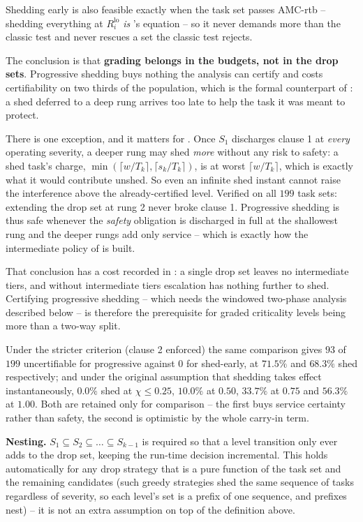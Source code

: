 \documentclass{article}
\begin{document}
Shedding early is also feasible exactly when the task set passes AMC-rtb --
shedding everything at $R_i^{\mathrm{lo}}$ \emph{is} 's
equation -- so it never demands more than the classic test and never rescues a
set the classic test rejects.

The conclusion is that \textbf{grading belongs in the budgets, not in the drop
sets}. Progressive shedding buys nothing the analysis can certify and costs
certifiability on two thirds of the population, which is the formal counterpart
of : a shed deferred to a deep rung arrives too late to help
the task it was meant to protect.

There is one exception, and it matters for . Once
$S_1$ discharges clause 1 at \emph{every} operating severity, a deeper rung may
shed \emph{more} without any risk to safety: a shed task's charge,
$\min(\lceil w/T_k \rceil, \lceil s_k/T_k \rceil)$, is at worst
$\lceil w/T_k \rceil$, which is exactly what it would contribute unshed. So
even an infinite shed instant cannot raise the interference above the
already-certified level. Verified on all $199$ task sets: extending the drop set
at rung 2 never broke clause 1. Progressive shedding is thus safe whenever the
\emph{safety} obligation is discharged in full at the shallowest rung and the
deeper rungs add only service -- which is exactly how the intermediate policy of
 is built.

That conclusion has a cost recorded in : a single drop set
leaves no intermediate tiers, and without intermediate tiers escalation has
nothing further to shed. Certifying progressive shedding -- which needs the
windowed two-phase analysis described below -- is therefore the prerequisite
for graded criticality levels being more than a two-way split.

Under the stricter criterion (clause 2 enforced) the same comparison gives
$93$ of $199$ uncertifiable for progressive against $0$ for shed-early, at
$71.5\%$ and $68.3\%$ shed respectively; and under the original assumption
that shedding takes effect instantaneously, $0.0\%$ shed at $\chi \leq 0.25$,
$10.0\%$ at $0.50$, $33.7\%$ at $0.75$ and $56.3\%$ at $1.00$. Both are
retained only for comparison -- the first buys service certainty rather than
safety, the second is optimistic by the whole carry-in term.

\textbf{Nesting.} $S_1 \subseteq S_2 \subseteq \dots \subseteq S_{k-1}$ is
required so that a level transition only ever adds to the drop set, keeping
the run-time decision incremental. This holds automatically for any drop
strategy that is a pure function of the task set and the remaining candidates
(such greedy strategies shed the same sequence of tasks regardless of
severity, so each level's set is a prefix of one sequence, and prefixes nest)
-- it is not an extra assumption on top of the definition above.
\end{document}
